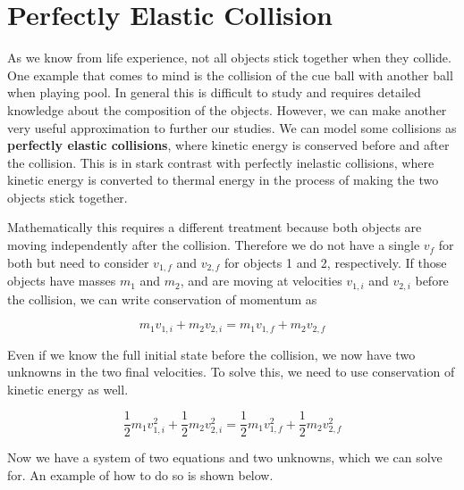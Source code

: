 \documentclass[12pt]{book}
\begin{document}
\section{Perfectly Elastic Collision}

As we know from life experience, not all objects stick together when they collide. One example that comes to mind is the collision of the cue ball with another ball when playing pool. In general this is difficult to study and requires detailed knowledge about the composition of the objects. However, we can make another very useful approximation to further our studies. We can model some collisions as \textbf{perfectly elastic collisions}, where kinetic energy is conserved before and after the collision. This is in stark contrast with perfectly inelastic collisions, where kinetic energy is converted to thermal energy in the process of making the two objects stick together.

Mathematically this requires a different treatment because both objects are moving independently after the collision. Therefore we do not have a single $v_f$ for both but need to consider $v_{1,f}$ and $v_{2,f}$ for objects 1 and 2, respectively. If those objects have masses $m_1$ and $m_2$, and are moving at velocities $v_{1,i}$ and $v_{2,i}$ before the collision, we can write conservation of momentum as

\begin{equation}
m_1 v_{1,i} + m_2 v_{2,i} = m_1 v_{1,f} + m_2 v_{2,f}
\label{elasticmom}
\end{equation}

Even if we know the full initial state before the collision, we now have two unknowns in the two final velocities. To solve this, we need to use conservation of kinetic energy as well.

\begin{equation}
\frac{1}{2} m_1 v_{1,i}^2 + \frac{1}{2} m_2 v_{2,i}^2 = \frac{1}{2} m_1 v_{1,f}^2 + \frac{1}{2} m_2 v_{2,f}^2
\label{elasticenergy}
\end{equation}

Now we have a system of two equations and two unknowns, which we can solve for. An example of how to do so is shown below.
\end{document}

